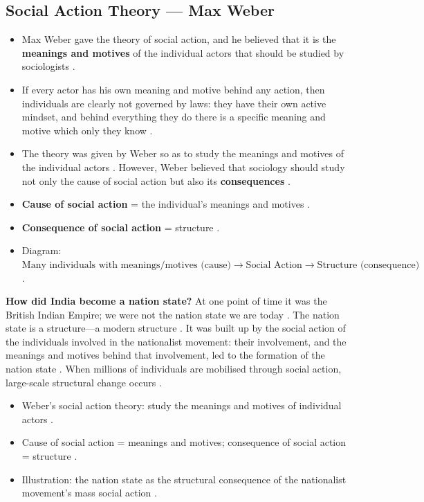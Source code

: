\subsection{Social Action Theory --- Max Weber}
\begin{itemize}
    \item Max Weber gave the theory of social action, and he believed that it is the \textbf{meanings and motives} of the individual actors that should be studied by sociologists .
    \item If every actor has his own meaning and motive behind any action, then individuals are clearly not governed by laws: they have their own active mindset, and behind everything they do there is a specific meaning and motive which only they know .
    \item The theory was given by Weber so as to study the meanings and motives of the individual actors . However, Weber believed that sociology should study not only the cause of social action but also its \textbf{consequences} .
\end{itemize}

\begin{KeyConcept}
\begin{itemize}
    \item \textbf{Cause of social action} = the individual's meanings and motives .
    \item \textbf{Consequence of social action} = structure .
    \item Diagram: $\text{Many individuals with meanings/motives (cause)} \longrightarrow \text{Social Action} \longrightarrow \text{Structure (consequence)}$ .
\end{itemize}
\end{KeyConcept}

\begin{ExampleBox}
\textbf{How did India become a nation state?} At one point of time it was the British Indian Empire; we were not the nation state we are today . The nation state is a structure---a modern structure . It was built up by the social action of the individuals involved in the nationalist movement: their involvement, and the meanings and motives behind that involvement, led to the formation of the nation state . When millions of individuals are mobilised through social action, large-scale structural change occurs .
\end{ExampleBox}

\begin{QuickRevision}
\begin{itemize}
    \item Weber's social action theory: study the meanings and motives of individual actors .
    \item Cause of social action = meanings and motives; consequence of social action = structure .
    \item Illustration: the nation state as the structural consequence of the nationalist movement's mass social action .
\end{itemize}
\end{QuickRevision}


